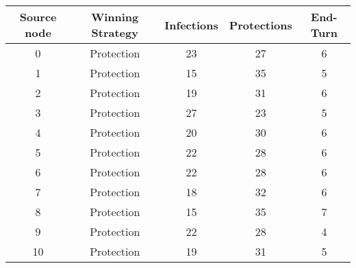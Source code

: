 \documentclass[results.tex]{subfiles}
\begin{document}
    \begin{center}
        \begin{tabular}{| c || c | c | c | c |}
            \hline
            {\bfseries Source node} & {\bfseries Winning Strategy} & {\bfseries Infections} & {\bfseries Protections}
            & {\bfseries End-Turn}
            \\  %
            \hline\hline
            0                       & Protection                   & 23                     & 27                      & 6                    \\
            \hline
            1                       & Protection                   & 15                     & 35                      & 5                    \\
            \hline
            2                       & Protection                   & 19                     & 31                      & 6                    \\
            \hline
            3                       & Protection                   & 27                     & 23                      & 5                    \\
            \hline
            4                       & Protection                   & 20                     & 30                      & 6                    \\
            \hline
            5                       & Protection                   & 22                     & 28                      & 6                    \\
            \hline
            6                       & Protection                   & 22                     & 28                      & 6                    \\
            \hline
            7                       & Protection                   & 18                     & 32                      & 6                    \\
            \hline
            8                       & Protection                   & 15                     & 35                      & 7                    \\
            \hline
            9                       & Protection                   & 22                     & 28                      & 4                    \\
            \hline
            10                      & Protection                   & 19                     & 31                      & 5                    \\

\end{tabular}
\end{center}
\end{document}

